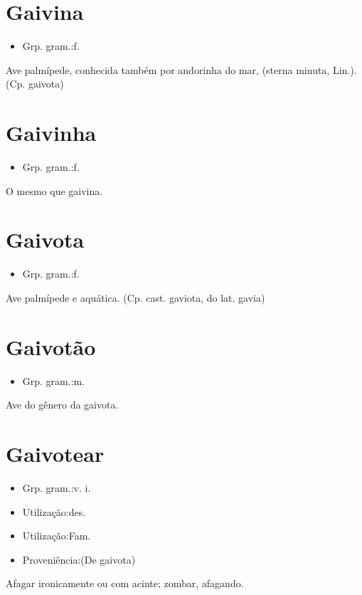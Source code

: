 \section{Gaivina}
\begin{itemize}
\item {Grp. gram.:f.}
\end{itemize}
Ave palmípede, conhecida também por \textunderscore andorinha do mar\textunderscore , (\textunderscore sterna minuta\textunderscore , Lin.).
(Cp. \textunderscore gaivota\textunderscore )
\section{Gaivinha}
\begin{itemize}
\item {Grp. gram.:f.}
\end{itemize}
O mesmo que \textunderscore gaivina\textunderscore .
\section{Gaivota}
\begin{itemize}
\item {Grp. gram.:f.}
\end{itemize}
Ave palmípede e aquática.
(Cp. cast. \textunderscore gaviota\textunderscore , do lat. \textunderscore gavia\textunderscore )
\section{Gaivotão}
\begin{itemize}
\item {Grp. gram.:m.}
\end{itemize}
Ave do gênero da gaivota.
\section{Gaivotear}
\begin{itemize}
\item {Grp. gram.:v. i.}
\end{itemize}
\begin{itemize}
\item {Utilização:des.}
\end{itemize}
\begin{itemize}
\item {Utilização:Fam.}
\end{itemize}
\begin{itemize}
\item {Proveniência:(De \textunderscore gaivota\textunderscore )}
\end{itemize}
Afagar ironicamente ou com acinte; zombar, afagando.
